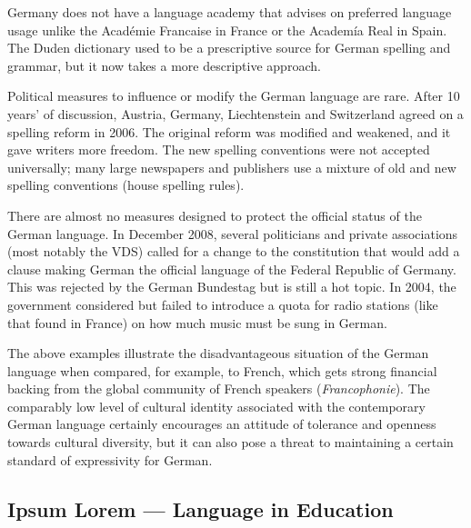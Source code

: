 \documentclass[]{../metanetpaper}
\begin{document}
\begin{Parallel}[c]{80mm}{80mm}
{    Germany does not have a language academy that advises on preferred language usage unlike the Académie Francaise in France or the Academía Real in Spain. The Duden dictionary used to be a prescriptive source for German spelling and grammar, but it now takes a more descriptive approach\cite{Schn1}. 

    Political measures to influence or modify the German language are rare. After 10 years’ of discussion, Austria, Germany, Liechtenstein and Switzerland agreed on a spelling reform in 2006. The original reform was modified and weakened, and it gave writers more freedom. The new spelling conventions were not accepted universally; many large newspapers and publishers use a mixture of old and new spelling conventions (house spelling rules).

    There are almost no measures designed to protect the official status of the German language. In December 2008, several politicians and private associations (most notably the VDS) called for a change to the constitution that would add a clause making German the official language of the Federal Republic of Germany. This was rejected by the German Bundestag but is still a hot topic. In 2004, the government considered but failed to introduce a quota for radio stations (like that found in France) on how much music must be sung in German. 

    The above examples illustrate the disadvantageous situation of the German language when compared, for example, to French, which gets strong financial backing from the global community of French speakers (\textit{Francophonie}). The comparably low level of cultural identity associated with the contemporary German language certainly encourages an attitude of tolerance and openness towards cultural diversity, but it can also pose a threat to maintaining a certain standard of expressivity for German.
  }

  \ParallelPar
  

  \subsection{Ipsum Lorem --- Language in Education}

\end{Parallel}
\end{document}
